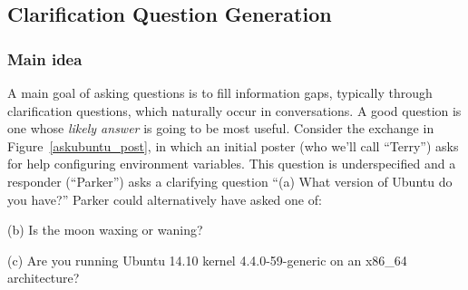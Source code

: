 \documentclass[11pt]{article}
\begin{document}
\subsection{Clarification Question Generation}

\subsubsection{Main idea}

A main goal of asking questions is to fill information gaps, typically through clarification questions, which naturally occur in conversations. 
A good question is one whose \emph{likely answer} is going to be most useful.
Consider the exchange in Figure~\ref{askubuntu_post}, in which an initial poster (who we'll call ``Terry'') asks for help configuring environment variables.
This question is underspecified and a responder (``Parker'') asks a clarifying question ``\textsf{\small (a) What version of Ubuntu do you have?}''
Parker could alternatively have asked one of:

\textsf{\small(b) Is the moon waxing or waning?}

\textsf{\small(c) Are you running Ubuntu 14.10 kernel 4.4.0-59-generic on an x86\_64 architecture?}
\end{document}
